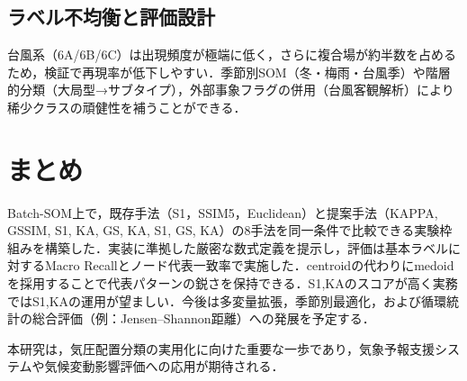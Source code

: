 \documentclass{jarticle}
\theoremstyle{definition}
\begin{document}
\subsection{ラベル不均衡と評価設計}
台風系（6A/6B/6C）は出現頻度が極端に低く，さらに複合場が約半数を占めるため，検証で再現率が低下しやすい．季節別SOM（冬・梅雨・台風季）や階層的分類（大局型→サブタイプ），外部事象フラグの併用（台風客観解析）により稀少クラスの頑健性を補うことができる．

\section{まとめ}
Batch-SOM上で，既存手法（S1，SSIM5，Euclidean）と提案手法（KAPPA, GSSIM, S1, KA, GS, KA, S1, GS, KA）の8手法を同一条件で比較できる実験枠組みを構築した．実装に準拠した厳密な数式定義を提示し，評価は基本ラベルに対するMacro Recallとノード代表一致率で実施した．centroidの代わりにmedoidを採用することで代表パターンの鋭さを保持できる．S1,KAのスコアが高く実務ではS1,KAの運用が望ましい．今後は多変量拡張，季節別最適化，および循環統計の総合評価（例：Jensen–Shannon距離）への発展を予定する．

本研究は，気圧配置分類の実用化に向けた重要な一歩であり，気象予報支援システムや気候変動影響評価への応用が期待される．



\end{document}
